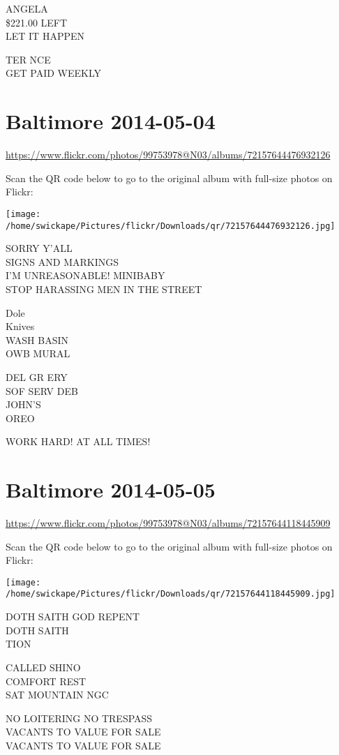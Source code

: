 \documentclass[10pt,letterpaper]{article}
\begin{document}
ANGELA\\
\$221.00 LEFT\\
LET IT HAPPEN

TER NCE\\
GET PAID WEEKLY


\section*{Baltimore 2014-05-04}

\url{https://www.flickr.com/photos/99753978@N03/albums/72157644476932126}

Scan the QR code below to go to the original album with full-size photos on Flickr:

\texttt{[image: /home/swickape/Pictures/flickr/Downloads/qr/72157644476932126.jpg]}


SORRY Y'ALL\\
SIGNS AND MARKINGS\\
I'M UNREASONABLE! MINIBABY\\
STOP HARASSING MEN IN THE STREET

Dole\\
Knives\\
WASH BASIN\\
OWB MURAL

DEL GR ERY\\
SOF SERV DEB\\
JOHN'S\\
OREO

WORK HARD!  AT ALL TIMES!


\section*{Baltimore 2014-05-05}

\url{https://www.flickr.com/photos/99753978@N03/albums/72157644118445909}

Scan the QR code below to go to the original album with full-size photos on Flickr:

\texttt{[image: /home/swickape/Pictures/flickr/Downloads/qr/72157644118445909.jpg]}


DOTH SAITH GOD REPENT\\
DOTH SAITH\\
TION

CALLED SHINO\\
COMFORT REST\\
SAT MOUNTAIN NGC

NO LOITERING NO TRESPASS\\
VACANTS TO VALUE FOR SALE\\
VACANTS TO VALUE FOR SALE
\end{document}
